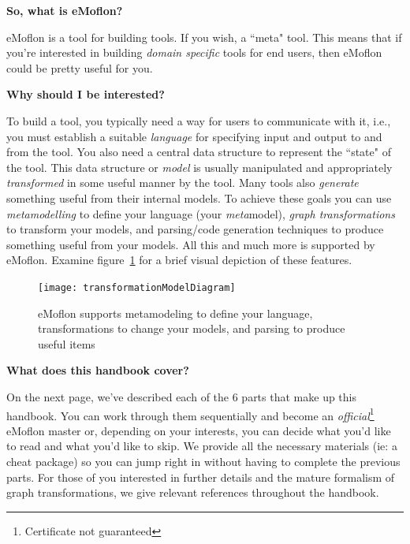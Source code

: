 {\bf \large So, what is eMoflon?}

eMoflon is a tool for building tools. If you wish, a ``meta" tool.  This means that if you're interested in building \emph{domain specific} tools for end users, then eMoflon could be pretty useful for you.


{\bf \large Why should I be interested?}

To build a tool, you typically need a way for users to communicate with it, i.e., you must establish a suitable \emph{language} for specifying input and output to and from the tool.  You also need a central data structure to represent the ``state" of the tool.  This data structure or \emph{model} is usually manipulated and appropriately \emph{transformed} in some useful manner by the tool.  Many tools also \emph{generate} something useful from their internal models. To achieve these goals you can use \emph{metamodelling} to define your language (your \emph{meta}model), \emph{graph transformations} to transform your models, and parsing/code generation techniques to produce something useful from your models. All this and much more is supported by eMoflon. Examine figure~\ref{fig:transModel} for a brief visual depiction of these features.

\begin{figure}[htbp]
	\centering
  \texttt{[image: transformationModelDiagram]}
	\caption{eMoflon supports metamodeling to define your language, transformations to change your models, and parsing to produce useful items}
	\label{fig:transModel}
\end{figure}

{\bf \large What does this handbook cover?}

On the next page, we've described each of the 6 parts that make up this handbook. You can work through them sequentially and become an \emph{official}\footnote{Certificate not guaranteed} eMoflon master or, depending on your interests, you can decide what you'd like to read and what you'd like to skip. We provide all the necessary materials (ie: a cheat package) so you can jump right in without having to complete the previous parts. For those of you interested in further details and the mature formalism of graph transformations, we give relevant references throughout the handbook.

\vfill
\pagebreak


